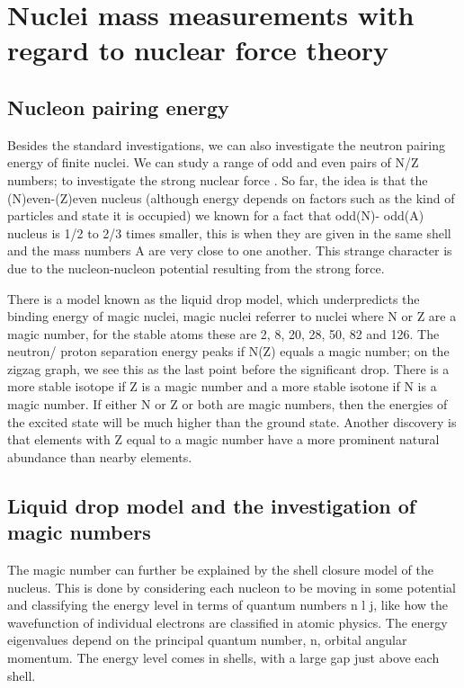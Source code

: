 \section{Nuclei mass measurements with regard to nuclear force theory}
\subsection{Nucleon pairing energy}
Besides the standard investigations, we can also investigate the neutron pairing energy of finite nuclei.
We can study a range of odd and even pairs of N/Z numbers; to investigate the strong nuclear force \cite{fred_neutron_2019}.
So far, the idea is that the (N)even-(Z)even nucleus (although energy depends on factors such as the kind of particles and state it is occupied) we known for a fact that odd(N)- odd(A) nucleus is 1/2 to 2/3 times smaller, this is when they are given in the same shell and the mass numbers A are very close to one another.
This strange character is due to the nucleon-nucleon potential resulting from the strong force. \cite{jensen_elementary_1955}

There is a model known as the liquid drop model, which underpredicts the binding energy of magic nuclei, magic nuclei referrer to nuclei where N or Z are a magic number, for the stable atoms these are 2, 8, 20, 28, 50, 82 and 126.
The neutron/ proton separation energy peaks if N(Z) equals a magic number; on the zigzag graph, we see this as the last point before the significant drop.
There is a more stable isotope if Z is a magic number and a more stable isotone if N is a magic number.
If either N or Z or both are magic numbers, then the energies of the excited state will be much higher than the ground state.
Another discovery is that elements with Z equal to a magic number have a more prominent natural abundance than nearby elements. \cite{kumawat_description_2018}

\subsection{Liquid drop model and the investigation of magic numbers}
The magic number can further be explained by the shell closure model of the nucleus.
This is done by considering each nucleon to be moving in some potential and classifying the energy level in terms of quantum numbers n l j, like how the wavefunction of individual electrons are classified in atomic physics.
The energy eigenvalues depend on the principal quantum number, n, orbital angular momentum.
The energy level comes in shells, with a large gap just above each shell. \cite{smolanczuk_particle}

